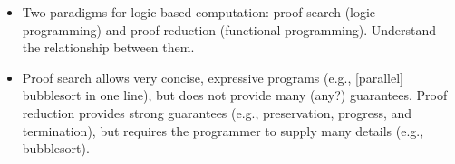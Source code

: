 \begin{itemize}
\item Two paradigms for logic-based computation: proof search (logic programming) and proof reduction (functional programming).
      Understand the relationship between them.
\item Proof search allows very concise, expressive programs (e.g., [parallel] bubblesort in one line), but does not provide many (any?) guarantees.
      Proof reduction provides strong guarantees (e.g., preservation, progress, and termination), but requires the programmer to supply many details (e.g., bubblesort).
\end{itemize}


